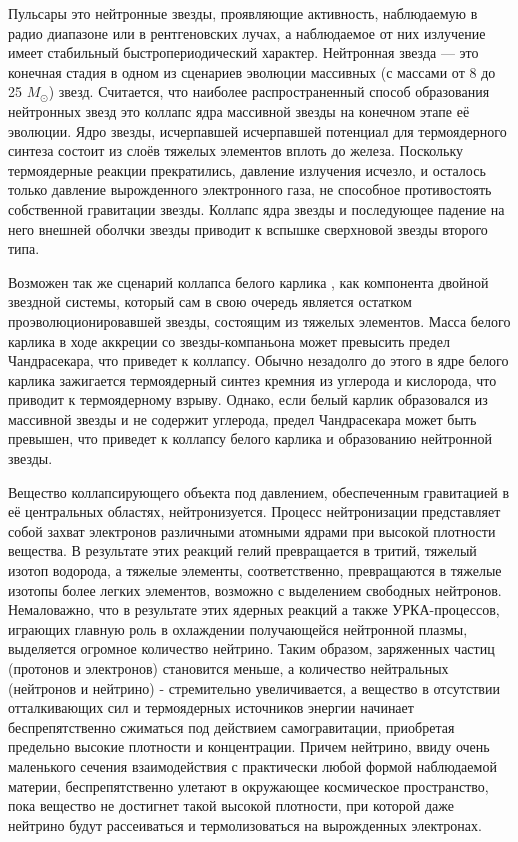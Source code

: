 \documentclass[14pt,a4paper]{extarticle}
\begin{document}

			Пульсары это нейтронные звезды, проявляющие активность, наблюдаемую в радио диапазоне или в рентгеновских лучах, а наблюдаемое от них излучение имеет стабильный быстропериодический характер.
			Нейтронная звезда --- это конечная стадия в одном из сценариев эволюции массивных (с массами от 8 до 25 $M_\odot$) звезд. 
			Считается, что наиболее распространенный способ образования нейтронных звезд это коллапс ядра массивной звезды на конечном этапе её эволюции.
			Ядро звезды, исчерпавшей исчерпавшей потенциал для термоядерного синтеза состоит из слоёв тяжелых элементов вплоть до железа.
			Поскольку термоядерные реакции прекратились, давление излучения исчезло, и осталось только давление вырожденного электронного газа, не способное противостоять собственной гравитации звезды.  
			Коллапс ядра звезды и последующее падение на него внешней оболчки звезды приводит к вспышке сверхновой звезды второго типа. 
			
			Возможен так же сценарий коллапса белого карлика \cite{canal1997}, как компонента двойной звездной системы, который сам в свою очередь является остатком проэволюционировавшей звезды, состоящим из тяжелых элементов. 
			Масса белого карлика в ходе аккреции со звезды-компаньона может превысить предел Чандрасекара, что приведет к коллапсу.
			Обычно незадолго до этого в ядре белого карлика зажигается термоядерный синтез кремния из углерода и кислорода, что приводит к термоядерному взрыву. 
			Однако, если белый карлик образовался из массивной звезды и не содержит углерода, предел Чандрасекара может быть превышен, что приведет к коллапсу белого карлика и образованию нейтронной звезды. 

			Вещество коллапсирующего объекта под давлением, обеспеченным гравитацией в её центральных областях, нейтронизуется.
			Процесс нейтронизации представляет собой захват электронов различными атомными ядрами при высокой плотности вещества.
			В результате этих реакций гелий превращается в тритий, тяжелый изотоп водорода, а тяжелые элементы, соответственно, превращаются в тяжелые изотопы более легких элементов, возможно с выделением свободных нейтронов. 
			Немаловажно, что в результате этих ядерных реакций а также УРКА-процессов, играющих главную роль в охлаждении получающейся нейтронной плазмы, выделяется огромное количество нейтрино.   
			Таким образом, заряженных частиц (протонов и электронов) становится меньше, а количество нейтральных (нейтронов и нейтрино) - стремительно увеличивается, а вещество в отсутствии отталкивающих сил и термоядерных источников энергии начинает беспрепятственно сжиматься под действием самогравитации, приобретая предельно высокие плотности и концентрации. 
			Причем нейтрино, ввиду очень маленького сечения взаимодействия с практически любой формой наблюдаемой материи, беспрепятственно улетают в окружающее космическое пространство, пока вещество не достигнет такой высокой плотности, при которой даже нейтрино будут рассеиваться и  термолизоваться на вырожденных электронах. 
\end{document}
